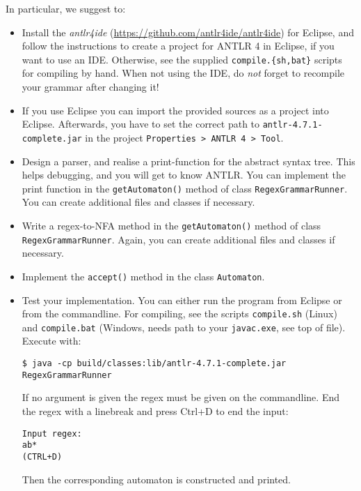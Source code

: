 \documentclass[a4paper]{article}
\begin{document}
\begin{exercise}{20}
	In particular, we suggest to:
	\begin{itemize}
	\item Install the \emph{antlr4ide} (\url{https://github.com/antlr4ide/antlr4ide}) for Eclipse, and follow the instructions to create a project for ANTLR 4 in Eclipse, if you want to use an IDE. Otherwise, see the supplied \texttt{compile.\{sh,bat\}} scripts for compiling by hand. When not using the IDE, do \textit{not} forget to recompile your grammar after changing it!
	\item If you use Eclipse you can import the provided sources as a project into Eclipse. Afterwards, you have to set the correct path to \texttt{antlr-4.7.1-complete.jar} in the project \texttt{Properties > ANTLR 4 > Tool}.
	\item Design a parser, and realise a print-function for the abstract syntax tree. This helps debugging, and you will get to know ANTLR.
        You can implement the print function in the \texttt{getAutomaton()} method of class \texttt{RegexGrammarRunner}.
        You can create additional files and classes if necessary.
	\item Write a regex-to-NFA method in the \texttt{getAutomaton()} method of class \texttt{RegexGrammarRunner}.
        Again, you can create additional files and classes if necessary.
	\item Implement the \texttt{accept()} method in the class \texttt{Automaton}.
    \item Test your implementation. You can either run the program from Eclipse or from the commandline. For compiling, see the scripts \texttt{compile.sh} (Linux) and \texttt{compile.bat} (Windows, needs path to your \texttt{javac.exe}, see top of file).\\ Execute with:
       \begin{lstlisting}[numbers=none,basicstyle=\ttfamily]
$ java -cp build/classes:lib/antlr-4.7.1-complete.jar RegexGrammarRunner
       \end{lstlisting}
       If no argument is given the regex must be given on the commandline. End the regex with a linebreak and press Ctrl+D to end the input:
       \begin{lstlisting}[numbers=none,basicstyle=\ttfamily]
Input regex:
ab*
(CTRL+D)
       \end{lstlisting}
       Then the corresponding automaton is constructed and printed.


\end{itemize}
\end{exercise}
\end{document}

